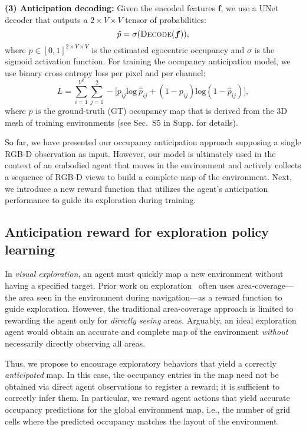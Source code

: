 \documentclass[runningheads]{llncs}
\newcommand{\bceloss}[2]{\sum_{i=1}^{V^2}\sum_{j=1}^{2} -\bigg[#2\text{log}~#1 + (1 - #2)\text{log}(1 - #1)\bigg]}
\begin{document}
\noindent\textbf{(3) Anticipation decoding:}
Given the encoded features $\bm{f}$, we use a UNet decoder that outputs a $2 \times V \times V$ tensor of probabilities:
\begin{equation}
    \hat{p} = \sigma(\textsc{Decode}(\bm{f})),
\end{equation} 
where $\hat{p} \in [0, 1]^{2\times V\times V}$ is the estimated egocentric occupancy and $\sigma$ is the sigmoid activation function. For training the occupancy anticipation model, we use binary cross entropy loss per pixel and per channel:
\begin{equation}
\label{eqn:loss_anticp}
L = \bceloss{\hat{p}_{ij}}{p_{ij}},
\end{equation} 
where $p$ is the ground-truth (GT) occupancy map that is derived from the 3D mesh of training environments (see Sec.~S5 in Supp. for details).  

So far, we have presented our occupancy anticipation approach supposing a single RGB-D observation as input. However, our model is ultimately used in the context of an embodied agent that moves in the environment and actively collects a sequence of RGB-D views to build a complete map of the environment. Next, we introduce a new reward function that utilizes the agent's anticipation performance to guide its exploration during training.


\subsection{Anticipation reward for exploration policy learning}
\label{sec:anticipation_reward}

In \emph{visual exploration}, an agent must quickly map a new environment without having a specified target. Prior work on exploration~\cite{chen2019learning,fang2019scene,chaplot2020learning,ramakrishnan2020exploration} often uses area-coverage---the area seen in the environment during navigation---as a reward function to guide exploration.  However, the traditional area-coverage approach is limited to rewarding the agent only for \emph{directly seeing} areas.  Arguably, an ideal exploration agent would obtain an accurate and complete map of the environment \emph{without} necessarily directly observing all areas.

Thus, we propose to encourage exploratory behaviors that yield a correctly \emph{anticipated} map. In this case, the occupancy entries in the map need not be obtained via direct agent observations to register a reward; it is sufficient to correctly infer them. In particular, we reward agent actions that yield accurate occupancy predictions for the global environment map, i.e., the number of grid cells where the predicted occupancy matches the layout of the environment.
\end{document}
